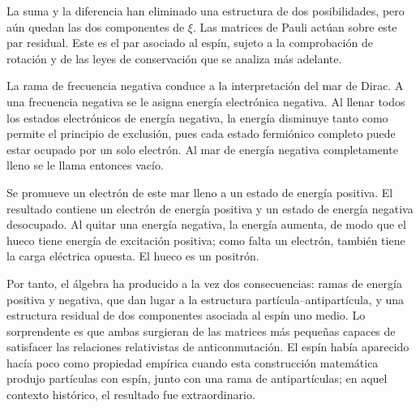 La suma y la diferencia han eliminado una estructura de dos posibilidades, pero aún quedan las dos componentes de \(\xi\). Las matrices de Pauli actúan sobre este par residual. Este es el par asociado al espín, sujeto a la comprobación de rotación y de las leyes de conservación que se analiza más adelante.

\begin{classroomqa}
\end{classroomqa}

La rama de frecuencia negativa conduce a la interpretación del mar de Dirac. A una frecuencia negativa se le asigna energía electrónica negativa. Al llenar todos los estados electrónicos de energía negativa, la energía disminuye tanto como permite el principio de exclusión, pues cada estado fermiónico completo puede estar ocupado por un solo electrón. Al mar de energía negativa completamente lleno se le llama entonces vacío.

Se promueve un electrón de este mar lleno a un estado de energía positiva. El resultado contiene un electrón de energía positiva y un estado de energía negativa desocupado. Al quitar una energía negativa, la energía aumenta, de modo que el hueco tiene energía de excitación positiva; como falta un electrón, también tiene la carga eléctrica opuesta. El hueco es un positrón.

\begin{classroomqa}
\end{classroomqa}

Por tanto, el álgebra ha producido a la vez dos consecuencias: ramas de energía positiva y negativa, que dan lugar a la estructura partícula--antipartícula, y una estructura residual de dos componentes asociada al espín uno medio. Lo sorprendente es que ambas surgieran de las matrices más pequeñas capaces de satisfacer las relaciones relativistas de anticonmutación. El espín había aparecido hacía poco como propiedad empírica cuando esta construcción matemática produjo partículas con espín, junto con una rama de antipartículas; en aquel contexto histórico, el resultado fue extraordinario.

